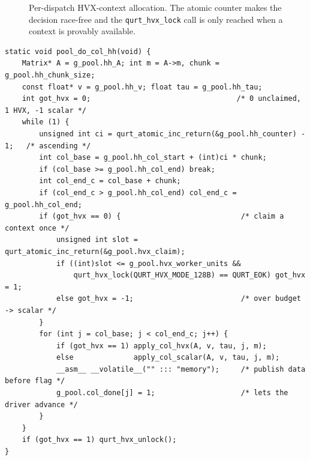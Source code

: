 \documentclass[11pt]{article}
\newcommand{\code}[1]{\texttt{\small #1}}
\begin{document}
\begin{figure}[h]
\centering
{}
\caption{Per-dispatch HVX-context allocation. The atomic counter makes the decision
race-free and the \code{qurt\_hvx\_lock} call is only reached when a context is provably
available.}
\end{figure}

\begin{lstlisting}[caption={\code{pool\_do\_col\_hh} --- worker body: ascending-column claim, budgeted HVX, publish completion.}]
static void pool_do_col_hh(void) {
    Matrix* A = g_pool.hh_A; int m = A->m, chunk = g_pool.hh_chunk_size;
    const float* v = g_pool.hh_v; float tau = g_pool.hh_tau;
    int got_hvx = 0;                                  /* 0 unclaimed, 1 HVX, -1 scalar */
    while (1) {
        unsigned int ci = qurt_atomic_inc_return(&g_pool.hh_counter) - 1;   /* ascending */
        int col_base = g_pool.hh_col_start + (int)ci * chunk;
        if (col_base >= g_pool.hh_col_end) break;
        int col_end_c = col_base + chunk;
        if (col_end_c > g_pool.hh_col_end) col_end_c = g_pool.hh_col_end;
        if (got_hvx == 0) {                            /* claim a context once */
            unsigned int slot = qurt_atomic_inc_return(&g_pool.hvx_claim);
            if ((int)slot <= g_pool.hvx_worker_units &&
                qurt_hvx_lock(QURT_HVX_MODE_128B) == QURT_EOK) got_hvx = 1;
            else got_hvx = -1;                         /* over budget -> scalar */
        }
        for (int j = col_base; j < col_end_c; j++) {
            if (got_hvx == 1) apply_col_hvx(A, v, tau, j, m);
            else              apply_col_scalar(A, v, tau, j, m);
            __asm__ __volatile__("" ::: "memory");     /* publish data before flag */
            g_pool.col_done[j] = 1;                    /* lets the driver advance */
        }
    }
    if (got_hvx == 1) qurt_hvx_unlock();
}
\end{lstlisting}
\end{document}
